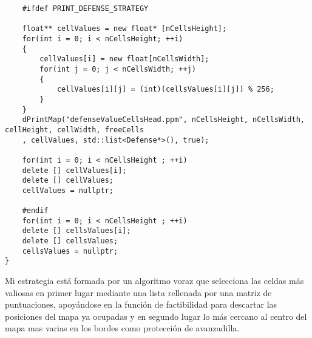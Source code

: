 \begin{lstlisting}
	#ifdef PRINT_DEFENSE_STRATEGY
	
	float** cellValues = new float* [nCellsHeight];
	for(int i = 0; i < nCellsHeight; ++i)
	{
		cellValues[i] = new float[nCellsWidth];
		for(int j = 0; j < nCellsWidth; ++j)
		{
			cellValues[i][j] = (int)(cellsValues[i][j]) % 256;
		}
	}
	dPrintMap("defenseValueCellsHead.ppm", nCellsHeight, nCellsWidth, cellHeight, cellWidth, freeCells
	, cellValues, std::list<Defense*>(), true);
	
	for(int i = 0; i < nCellsHeight ; ++i)
	delete [] cellValues[i];
	delete [] cellValues;
	cellValues = nullptr;
	
	#endif
	for(int i = 0; i < nCellsHeight ; ++i)
	delete [] cellsValues[i];
	delete [] cellsValues;
	cellsValues = nullptr;
}
\end{lstlisting}
Mi estrategia está formada por un algoritmo voraz que selecciona las celdas más valiosas en primer lugar mediante una lista rellenada por una matriz de puntuaciones, apoyándose en la función de factibilidad para descartar las posiciones del mapa ya ocupadas y en segundo lugar lo más cercano al centro del mapa mas varias en los bordes como protección de avanzadilla.